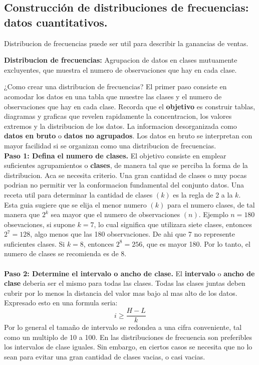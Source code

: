 \documentclass[]{article}
\begin{document}
\subsection{Construcción de distribuciones de frecuencias: datos cuantitativos.}
Distribucion de frecuencias puede ser util para describir la ganancias de ventas.
\begin{center}
	\textbf{Distribucion de frecuencias: }Agrupacion de datos en clases mutuamente excluyentes, que muestra el numero de observaciones que hay en cada clase.
\end{center}
¿Como crear una distribucion de frecuencias? El primer paso consiste en acomodar los datos en una tabla que muestre las clases y el numero de observaciones que hay en cada clase. Recorda que el \textbf{objetivo} es construir tablas, diagramas y graficas que revelen rapidamente la concentracion, los valores extremos y la distribucion de los datos.
La informacion desorganizada como \textbf{datos en bruto} o \textbf{datos no agrupados}. Los datos en bruto se interpretan con mayor facilidad si se organizan como una distribucion de frecuencias.\\
\textbf{Paso 1: Defina el numero de clases.} El objetivo consiste en emplear suficientes agrupamientos o \textbf{clases}, de manera tal que se perciba la forma de la distribucion. Aca se necesita criterio. Una gran cantidad de clases o muy pocas podrian no permitir ver la conformacion fundamental del conjunto datos. Una receta util para determinar la cantidad de clases $(k)$ es la regla de 2 a la $k$. Esta guia sugiere que se elija el menor numero $ (k) $ para el numero clases, de tal manera que $ 2^{k} $ sea mayor que el numero de observaciones $ (n) $. Ejemplo $ n=180 $ obsevaciones, si supone $ k=7 $, lo cual significa que utilizara siete clases, entonces $ 2^{7}=128 $, algo menos que las 180 observaciones. De ahi que 7 no represente suficientes clases. Si $ k=8 $, entonces $ 2^{8}=256$, que es mayor 180. Por lo tanto, el numero de clases se recomienda es de 8. \\\\
\textbf{Paso 2: Determine el intervalo o ancho de clase.} El \textbf{intervalo} o \textbf{ancho de clase} deberia ser el mismo para todas las clases. Todas las clases juntas deben cubrir por lo menos la distancia del valor mas bajo al mas alto de los datos. Expresado esto en una formula seria:
\[ i\geq \frac{H-L}{k} \]
Por lo general el tamaño de intervalo se redondea a una cifra conveniente, tal como un multiplo de 10 a 100. En las distribuciones de frecuencia son preferibles los intervalos de clase iguales. Sin embargo, en ciertos casos se necesita que no lo sean para evitar una gran cantidad de clases vacias, o casi vacias.\\\\
\end{document}
